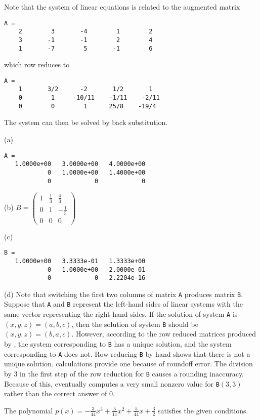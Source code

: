 \soln Note that the system of linear equations is related to the
augmented matrix
\begin{verbatim}
A = 
    2        3       -4        1        2
    3       -1       -1        2        4
    1       -7        5       -1        6
\end{verbatim}
which row reduces to
\begin{verbatim}
A =
    1       3/2      -2       1/2       1
    0        1     -10/11    -1/11    -2/11
    0        0        1      25/8    -19/4
\end{verbatim}
The system can then be solved by back substitution.

(a)
\begin{verbatim}
A =
   1.0000e+00   3.0000e+00   4.0000e+00
            0   1.0000e+00   1.4000e+00
            0            0            0
\end{verbatim}

(b)
$B = \left(\begin{array}{rrr}
1 & \frac{1}{3} & \frac{4}{3} \\
0 & 1 & -\frac{1}{5} \\
0 & 0 & 0\end{array} \right)$

(c)
\begin{verbatim}
B =
   1.0000e+00   3.3333e-01   1.3333e+00
            0   1.0000e+00  -2.0000e-01
            0            0   2.2204e-16
\end{verbatim}


(d) Note that switching the first two columns of matrix {\tt A} produces
matrix {\tt B}.  Suppose that {\tt A} and {\tt B} represent the left-hand
sides of linear systems with the same vector representing the right-hand
sides.  If the solution of system {\tt A} is $(x,y,z) = (a,b,c)$, then the
solution of system {\tt B} should be $(x,y,z) = (b,a,c)$.  However,
according to the row reduced matrices produced by \Matlab, the system
corresponding to {\tt B} has a unique solution, and the system
corresponding to {\tt A} does not.  Row reducing {\tt B} by hand shows
that there is not a unique solution.  \Matlab calculations provide one because of 
roundoff error.  The division by 3 in the first step of the row reduction
for {\tt B} causes a rounding inaccuracy.  Because of this, \Matlab
eventually computes a very small nonzero value for {\tt B}$(3,3)$
rather than the correct answer of 0.

\ans The polynomial $p(x) = -\frac{3}{44}x^3 + \frac{5}{11}x^2 +
\frac{5}{44}x + \frac{3}{2}$ satisfies the given conditions.

